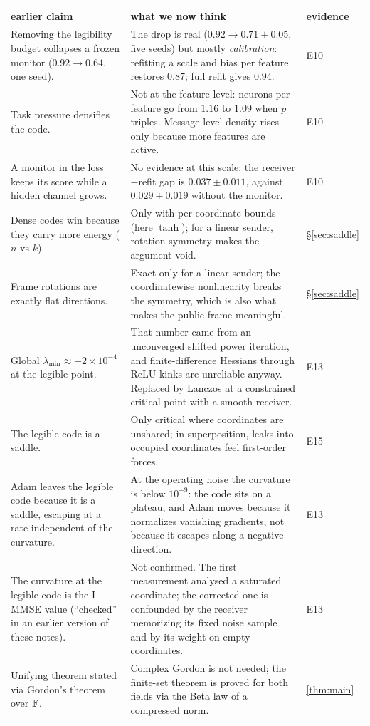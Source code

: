 \begin{center}\small
\begin{tabularx}{\linewidth}{@{}>{\raggedright\arraybackslash}p{4.6cm}>{\raggedright\arraybackslash}X l@{}}\toprule
earlier claim & what we now think & evidence \\\midrule
Removing the legibility budget collapses a frozen monitor ($0.92\to0.64$, one seed). &
The drop is real ($0.92\to0.71\pm0.05$, five seeds) but mostly \emph{calibration}: refitting a scale and bias per
feature restores $0.87$; full refit gives $0.94$. & E10 \\
Task pressure densifies the code. & Not at the feature level: neurons per feature go from $1.16$ to $1.09$ when $p$
triples. Message-level density rises only because more features are active. & E10 \\
A monitor in the loss keeps its score while a hidden channel grows. & No evidence at this scale: the
receiver$-$refit gap is $0.037\pm0.011$, against $0.029\pm0.019$ without the monitor. & E10 \\
Dense codes win because they carry more energy ($n$ vs $k$). & Only with per-coordinate bounds (here $\tanh$);
for a linear sender, rotation symmetry makes the argument void. & \S\ref{sec:saddle} \\
Frame rotations are exactly flat directions. & Exact only for a linear sender; the coordinatewise nonlinearity breaks
the symmetry, which is also what makes the public frame meaningful. & \S\ref{sec:saddle} \\
Global $\lambda_{\min}\approx-2\times10^{-4}$ at the legible point. & That number came from an unconverged
shifted power iteration, and finite-difference Hessians through ReLU kinks are unreliable anyway. Replaced by Lanczos at a
constrained critical point with a smooth receiver. & E13 \\
The legible code is a saddle. & Only critical where coordinates are unshared; in superposition, leaks into
occupied coordinates feel first-order forces. & E15 \\
Adam leaves the legible code because it is a saddle, escaping at a rate independent of the curvature. & At the
operating noise the curvature is below $10^{-9}$: the code sits on a plateau, and Adam moves because it normalizes
vanishing gradients, not because it escapes along a negative direction. & E13 \\
The curvature at the legible code is the I-MMSE value (``checked'' in an earlier version of these notes). & Not
confirmed. The first measurement analysed a saturated coordinate; the corrected one is confounded by the receiver
memorizing its fixed noise sample and by its weight on empty coordinates. & E13 \\
Unifying theorem stated via Gordon's theorem over $\mathbb F$. & Complex Gordon is not needed; the finite-set theorem is
proved for both fields via the Beta law of a compressed norm. & \cref{thm:main} \\
\bottomrule\end{tabularx}
\end{center}
